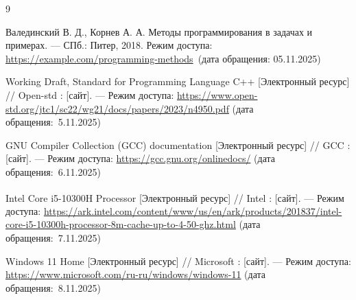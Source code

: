 
\begin{thebibliography}{9}

	Валединский В. Д., Корнев А. А. 
	{Методы программирования в задачах и примерах}. --- СПб.: Питер, 2018.  
	Режим доступа: \url{https://example.com/programming-methods}~(дата обращения: 05.11.2025)


	Working Draft, Standard for Programming Language C++ [Электронный ресурс] // Open-std : [сайт]. --- Режим доступа: \url{https://www.open-std.org/jtc1/sc22/wg21/docs/papers/2023/n4950.pdf} (дата обращения:~5.11.2025)

	GNU Compiler Collection (GCC) documentation [Электронный ресурс] // GCC : [сайт]. --- Режим доступа: \url{https://gcc.gnu.org/onlinedocs/} (дата обращения:~6.11.2025)

	Intel\textsuperscript{\textregistered} Core\texttrademark{} i5-10300H Processor [Электронный ресурс] // Intel : [сайт]. --- Режим доступа: \url{https://ark.intel.com/content/www/us/en/ark/products/201837/intel-core-i5-10300h-processor-8m-cache-up-to-4-50-ghz.html} (дата обращения:~7.11.2025)

	Windows 11 Home [Электронный ресурс] // Microsoft : [сайт]. --- Режим доступа: \url{https://www.microsoft.com/ru-ru/windows/windows-11} (дата обращения:~8.11.2025)


\end{thebibliography}
